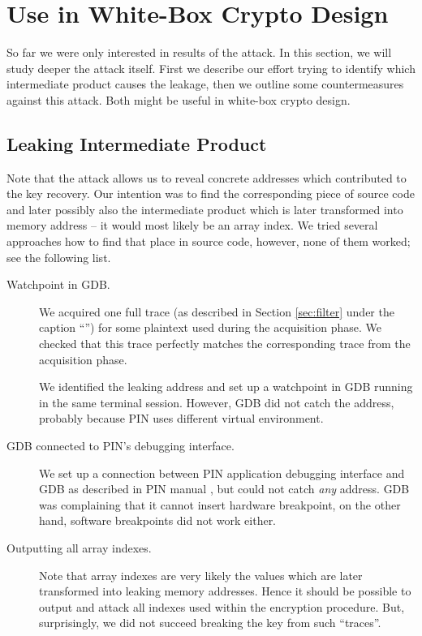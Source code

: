 \section{Use in White-Box Crypto Design}
\label{sec:useindesign}

So far we were only interested in results of the attack. In this section, we will study deeper the attack itself. First we describe our effort trying to identify which intermediate product causes the leakage, then we outline some countermeasures against this attack. Both might be useful in white-box crypto design.



\subsection{Leaking Intermediate Product}

Note that the attack allows us to reveal concrete addresses which contributed to the key recovery. Our intention was to find the corresponding piece of source code and later possibly also the intermediate product which is later transformed into memory address -- it would most likely be an array index. We tried several approaches how to find that place in source code, however, none of them worked; see the following list.

\begin{description}
	\item[Watchpoint in GDB.]
		We acquired one full trace (as described in Section \ref{sec:filter} under the caption ``\AddrTempFilter'') for some plaintext used during the acquisition phase. We checked that this trace perfectly matches the corresponding trace from the acquisition phase.
		
		We identified the leaking address and set up a watchpoint in GDB running in the same terminal session. However, GDB did not catch the address, probably because PIN uses different virtual environment.
	\item[GDB connected to PIN's debugging interface.]
		We set up a connection between PIN application debugging interface and GDB as described in PIN manual \cite{pin214manual}, but could not catch {\em any} address. GDB was complaining that it cannot insert hardware breakpoint, on the other hand, software breakpoints did not work either.
	\item[Outputting all array indexes.]
		Note that array indexes are very likely the values which are later transformed into leaking memory addresses. Hence it should be possible to output and attack all indexes used within the encryption procedure. But, surprisingly, we did not succeed breaking the key from such ``traces''.
\end{description}

